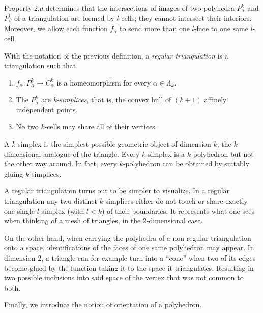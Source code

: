 Property $2.d$ determines that the intersections of images of two polyhedra $P^k_{\alpha}$ and $P^t_{\beta}$ of a triangulation are formed by $l$-cells; they cannot intersect their interiors. Moreover, we allow each function $f_{\alpha}$ to send more than one $l$-face to one same $l$-cell.


\bigskip

\begin{definition}
    With the notation of the previous definition, a \textit{regular triangulation} is a triangulation such that
    \begin{enumerate}
        \item $f_{\alpha}: P^k_{\alpha} \to C^k_{\alpha}$ is a homeomorphism for every $\alpha\in\Lambda_k$.
        \item The $P^k_{\alpha}$ are \textit{k-simplices}, that is, the convex hull of $(k+1)$ affinely independent points.
        \item No two $k$-cells may share all of their vertices.
    \end{enumerate}
\end{definition}

\begin{remark}
    A $k$-simplex is the simplest possible geometric object of dimension $k$, the $k$-dimensional analogue of the triangle. Every $k$-simplex is a $k$-polyhedron but not the other way around. In fact, every $k$-polyhedron can be obtained by suitably gluing $k$-simplices.
\end{remark}

\bigskip

A regular triangulation turns out to be simpler to visualize. In a regular triangulation any two distinct $k$-simplices either do not touch or share exactly one single $l$-simplex (with $l<k$) of their boundaries. It represents what one sees when thinking of a mesh of triangles, in the $2$-dimensional case.

On the other hand, when carrying the polyhedra of a non-regular triangulation onto a space, identifications of the faces of one same polyhedron may appear. In dimension $2$, a triangle can for example turn into a ``cone'' when two of its edges become glued by the function taking it to the space it triangulates. Resulting in two possible inclusions into said space of the vertex that was not common to both.

\bigskip

Finally, we introduce the notion of orientation of a polyhedron.

